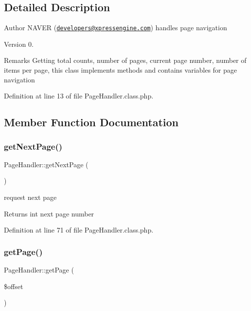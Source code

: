 \subsection{Detailed Description}
\begin{DoxyAuthor}{Author}
N\+A\+V\+ER (\href{mailto:developers@xpressengine.com}{\tt developers@xpressengine.\+com}) handles page navigation 
\end{DoxyAuthor}
\begin{DoxyVersion}{Version}
0.
\end{DoxyVersion}
\begin{DoxyRemark}{Remarks}
Getting total counts, number of pages, current page number, number of items per page, this class implements methods and contains variables for page navigation 
\end{DoxyRemark}


Definition at line 13 of file Page\+Handler.\+class.\+php.



\subsection{Member Function Documentation}
\hypertarget{classPageHandler_a259d01838d005d854d4cc263ba524de7}{}\label{classPageHandler_a259d01838d005d854d4cc263ba524de7} 
\subsubsection{\texorpdfstring{get\+Next\+Page()}{getNextPage()}}
{\footnotesize\ttfamily Page\+Handler\+::get\+Next\+Page (\begin{DoxyParamCaption}{ }\end{DoxyParamCaption})}

request next page \begin{DoxyReturn}{Returns}
int next page number 
\end{DoxyReturn}


Definition at line 71 of file Page\+Handler.\+class.\+php.

\hypertarget{classPageHandler_a971f178609a0dd6e1a0fd07daa94782d}{}\label{classPageHandler_a971f178609a0dd6e1a0fd07daa94782d} 
\subsubsection{\texorpdfstring{get\+Page()}{getPage()}}
{\footnotesize\ttfamily Page\+Handler\+::get\+Page (\begin{DoxyParamCaption}\item[{}]{\$offset }\end{DoxyParamCaption})}


